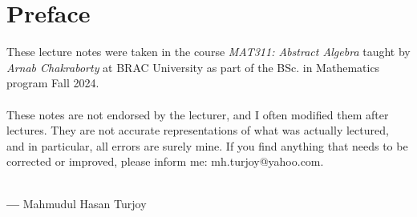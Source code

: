 \section*{Preface}
These lecture notes were taken in the course \textit{MAT311: Abstract Algebra} taught by \textit{Arnab Chakraborty} at BRAC University as part of the BSc. in Mathematics program Fall 2024.\\\\
These notes are not endorsed by the lecturer, and I often modified them after lectures. They are not accurate representations of what was actually lectured, and in particular, all errors are surely mine. If you find anything that needs to be corrected or improved, please inform me: mh.turjoy@yahoo.com.\\\\
\begin{flushright}
    \textbf{---} Mahmudul Hasan Turjoy
\end{flushright}